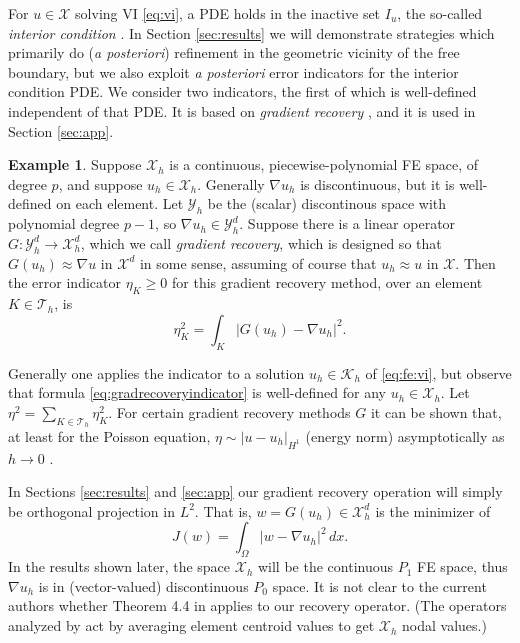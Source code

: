 \documentclass[]{interact}
\theoremstyle{plain}%
\theoremstyle{definition}
\newtheorem{example}[theorem]{Example}
\theoremstyle{remark}
\newcommand{\grad}{\nabla}
\newcommand{\cK}{\mathcal{K}}
\newcommand{\cT}{\mathcal{T}}
\newcommand{\cX}{\mathcal{X}}
\newcommand{\cY}{\mathcal{Y}}
\begin{document}
For $u\in\cX$ solving VI \eqref{eq:vi}, a PDE holds in the inactive set $I_u$, the so-called \emph{interior condition} \cite{KinderlehrerStampacchia1980}.  In Section \ref{sec:results} we will demonstrate strategies which primarily do (\emph{a posteriori}) refinement in the geometric vicinity of the free boundary, but we also exploit \emph{a posteriori} error indicators for the interior condition PDE.  We consider two indicators, the first of which is well-defined independent of that PDE.  It is based on \emph{gradient recovery} \cite[Chapter 4]{AinsworthOden2000}, and it is used in Section \ref{sec:app}.

\begin{example}  \label{example:gradrecovery}  Suppose $\cX_h$ is a continuous, piecewise-polynomial FE space, of degree $p$, and suppose $u_h\in\cX_h$.  Generally $\grad u_h$ is discontinuous, but it is well-defined on each element.  Let $\cY_h$ be the (scalar) discontinous space with polynomial degree $p-1$, so $\grad u_h \in \cY_h^d$.  Suppose there is a linear operator $G : \cY_h^d \to \cX_h^d$, which we call \emph{gradient recovery}, which is designed so that $G(u_h)\approx \grad u$ in $\cX^d$ in some sense, assuming of course that $u_h\approx u$ in $\cX$.  Then the error indicator $\eta_K\ge 0$ for this gradient recovery method, over an element $K \in\cT_h$, is
\begin{equation} \label{eq:gradrecoveryindicator}
\eta_K^2 = \int_K \left|G(u_h) - \grad u_h\right|^2.
\end{equation}
\end{example}

Generally one applies the indicator to a solution $u_h \in \cK_h$ of \eqref{eq:fe:vi}, but observe that formula \eqref{eq:gradrecoveryindicator} is well-defined for any $u_h \in \cX_h$.  Let $\eta^2 = \sum_{K\in\cT_h} \eta_K^2$.  For certain gradient recovery methods $G$ it can be shown that, at least for the Poisson equation, $\eta \sim |u-u_h|_{H^1}$ (energy norm) asymptotically as $h\to 0$ \cite[Theorem 4.4]{AinsworthOden2000}.

In Sections \ref{sec:results} and \ref{sec:app} our gradient recovery operation will simply be orthogonal projection in $L^2$.  That is, $w = G(u_h) \in \cX_h^d$ is the minimizer of
\begin{equation} \label{eq:gradrecoveryprojection}
J(w) = \int_\Omega |w - \grad u_h|^2\,dx.
\end{equation}
In the results shown later, the space $\cX_h$ will be the continuous $P_1$ FE space, thus $\grad u_h$ is in (vector-valued) discontinuous $P_0$ space.  It is not clear to the current authors whether Theorem 4.4 in \cite{AinsworthOden2000} applies to our recovery operator.  (The operators analyzed by \cite{AinsworthOden2000} act by averaging element centroid values to get $\cX_h$ nodal values.)
\end{document}
